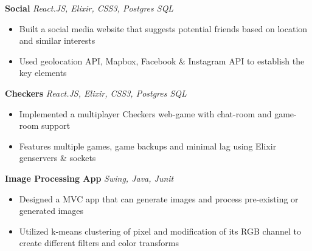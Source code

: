 \documentclass[]{article}
\begin{document}
\vspace{-2mm}
{\hspace{2mm}\textbf{Social}} {\sl React.JS, Elixir, CSS3, Postgres SQL} \\
\vspace{-3mm}
\begin{itemize}
        \setlength\itemsep{-1mm}
        \item Built a social media website that suggests potential friends based on location and
        similar interests
        \item Used geolocation API, Mapbox, Facebook \& Instagram API to establish the key elements
\end{itemize}
\vspace{-2mm}
{\hspace{2mm}\textbf{Checkers}} {\sl React.JS, Elixir, CSS3, Postgres SQL} \\
\vspace{-3mm}
\begin{itemize}
        \setlength\itemsep{-1mm}
        \item Implemented a multiplayer Checkers web-game with chat-room and game-room support
        \item Features multiple games, game backups and minimal lag using Elixir genservers \& sockets
\end{itemize}

\vspace{-2mm}
{\hspace{2mm}\textbf{Image Processing App}} {\sl Swing, Java, Junit} \\
\vspace{-3mm}
\begin{itemize}
        \setlength\itemsep{-1mm}
        \item Designed a MVC app that can generate images and process pre-existing or generated images  
        \item Utilized k-means clustering of pixel and modification of its RGB channel to create different filters and color transforms 
\end{itemize}
\end{document}
